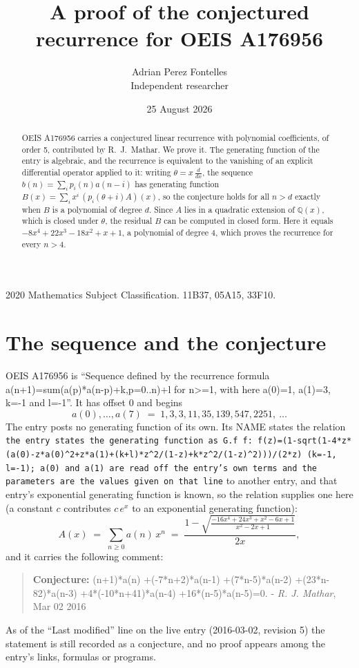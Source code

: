 \documentclass[11pt,a4paper]{article}
\title{A proof of the conjectured recurrence for OEIS A176956}
\author{Adrian Perez Fontelles\\ \small Independent researcher}
\date{25 August 2026}
\theoremstyle{plain}
\theoremstyle{definition}
\begin{document}
\maketitle

\begin{abstract}
OEIS A176956 carries a conjectured linear recurrence with polynomial coefficients, of
order 5, contributed by R.~J.~Mathar. We prove it. The generating function of the
entry is algebraic, and the recurrence is equivalent to the vanishing of an explicit
differential operator applied to it: writing $\theta=x\,\frac{d}{dx}$, the sequence
$b(n)=\sum_{i}p_{i}(n)a(n-i)$ has generating function
$B(x)=\sum_{i}x^{i}\,(p_{i}(\theta+i)A)(x)$, so the conjecture holds for all $n>d$ exactly
when $B$ is a polynomial of degree $d$. Since $A$ lies in a quadratic extension of
$\mathbb{Q}(x)$, which is closed under $\theta$, the residual $B$ can be computed in
closed form. Here it equals $- 8 x^{4} + 22 x^{3} - 18 x^{2} + x + 1$, a polynomial of degree $4$, which proves
the recurrence for every $n>4$.
\end{abstract}

\noindent\small 2020 Mathematics Subject Classification. 11B37, 05A15, 33F10.\normalsize

\section{The sequence and the conjecture}

OEIS A176956 is ``Sequence defined by the recurrence formula a(n+1)=sum(a(p)*a(n-p)+k,p=0..n)+l for n>=1, with here a(0)=1, a(1)=3, k=-1 and l=-1''. It has offset $0$ and begins
\[
a(0),\dots,a(7)\;=\;1, 3, 3, 11, 35, 139, 547, 2251,\ \dots
\]
The entry posts no generating function of its own. Its NAME states the
relation \texttt{the entry states the generating function as G.f f: f(z)=(1-sqrt(1-4*z*(a(0)-z*a(0)\textasciicircum{}2+z*a(1)+(k+l)*z\textasciicircum{}2/(1-z)+k*z\textasciicircum{}2/(1-z)\textasciicircum{}2)))/(2*z) (k=-1, l=-1); a(0) and a(1) are read off the entry's own terms and the parameters are the values given on that line} to another entry, and that entry's exponential generating
function is known, so the relation supplies one here (a constant $c$ contributes
$c\,e^{x}$ to an exponential generating function):
\begin{equation}\label{eq:gf}
A(x)\;=\;\sum_{n\ge 0} a(n)\,x^{n}\;=\;\frac{1 - \sqrt{\frac{- 16 x^{4} + 24 x^{3} + x^{2} - 6 x + 1}{x^{2} - 2 x + 1}}}{2 x} ,
\end{equation}
and it carries the following comment:
\begin{quote}\small
\textbf{Conjecture:} (n+1)*a(n) +(-7*n+2)*a(n-1) +(7*n-5)*a(n-2) +(23*n-82)*a(n-3) +4*(-10*n+41)*a(n-4) +16*(n-5)*a(n-5)=0. - \emph{R. J. Mathar}, Mar 02 2016
\end{quote}
As of the ``Last modified'' line on the live entry (2016-03-02, revision 5) the
statement is still recorded as a conjecture, and no proof appears among the entry's links,
formulas or programs.
\end{document}
